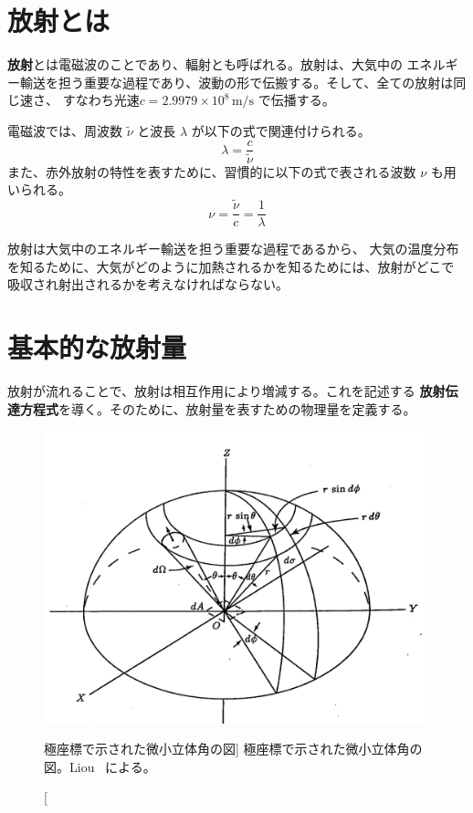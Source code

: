 \documentclass[book]{dennou777}
\newcommand{\hmunit}[1]{\,\mathrm{#1}}
\newcommand{\hmemph}[1]{\textbf{#1}}
\begin{document}
\section{放射とは}

\hmemph{放射}とは電磁波のことであり、輻射とも呼ばれる\cite{asano}。放射は、大気中の
エネルギー輸送を担う重要な過程であり、波動の形で伝搬する。そして、全ての放射は同じ速さ、
すなわち光速$c=2.9979\times10^8\hmunit{m/s}$ で伝播する。

電磁波では、周波数 $\tilde\nu$ と波長 $\lambda$ が以下の式で関連付けられる。
\begin{equation}
	\lambda=\frac{c}{\tilde\nu}
\end{equation}
また、赤外放射の特性を表すために、習慣的に以下の式で表される波数 $\nu$ も用いられる。
\begin{equation}
	\nu=\frac{\tilde\nu}{c}=\frac{1}{\lambda}
\end{equation}

放射は大気中のエネルギー輸送を担う重要な過程であるから、
大気の温度分布を知るために、大気がどのように加熱されるかを知るためには、放射がどこで
吸収され射出されるかを考えなければならない。

\section{基本的な放射量}

放射が流れることで、放射は相互作用により増減する。これを記述する
\hmemph{放射伝達方程式}を導く。そのために、放射量を表すための物理量を定義する。

\begin{figure}[t]
	\includegraphics[width=\linewidth]{eq2.jpg}
	\caption
		[極座標で示された微小立体角の図]
		{極座標で示された微小立体角の図。Liou~\cite{liou} による。}
\end{figure}
\end{document}
